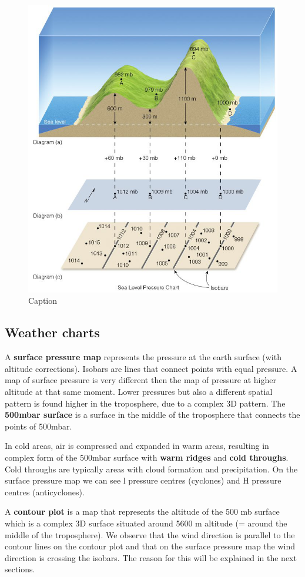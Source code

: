 \documentclass[oneside]{book}
\begin{document}
\begin{figure}

{\centering \includegraphics[width=0.4\linewidth]{figures/Figure44} 

}

\caption{Caption}\label{fig:Altcorrec}
\end{figure}

\subsection{Weather charts}\label{weather-charts}

A \textbf{surface pressure map} represents the pressure at the earth
surface (with altitude corrections). Isobars are lines that connect
points with equal pressure. A map of surface pressure is very different
then the map of pressure at higher altitude at that same moment. Lower
pressures but also a different spatial pattern is found higher in the
troposphere, due to a complex 3D pattern. The \textbf{500mbar surface}
is a surface in the middle of the troposphere that connects the points
of 500mbar.

In cold areas, air is compressed and expanded in warm areas, resulting
in complex form of the 500mbar surface with \textbf{warm ridges} and
\textbf{cold throughs}. Cold throughs are typically areas with cloud
formation and precipitation. On the surface pressure map we can see l
pressure centres (cyclones) and H pressure centres (anticyclones).

A \textbf{contour plot} is a map that represents the altitude of the 500
mb surface which is a complex 3D surface situated around 5600 m altitude
(= around the middle of the troposphere). We observe that the wind
direction is parallel to the contour lines on the contour plot and that
on the surface pressure map the wind direction is crossing the isobars.
The reason for this will be explained in the next sections.
\end{document}
